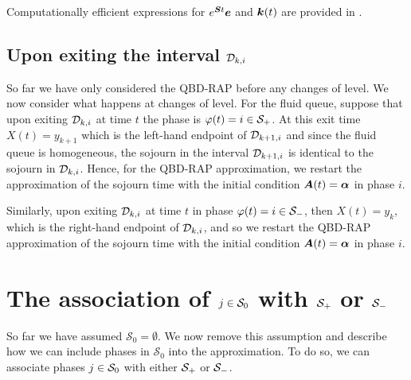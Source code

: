 Computationally efficient expressions for \(e^{\boldsymbol{S}t}\boldsymbol e\) and \(\boldsymbol k(t)\) are provided in \citep{hht2020}. 

\subsection{Upon exiting the interval \(\mathcal{D}_{k,i}\)} So far we have only considered the QBD-RAP before any changes of level. We now consider what happens at changes of level. For the fluid queue, suppose that upon exiting \(\mathcal{D}_{k,i}\) at time \(t\) the phase is \(\varphi(t)=i\in\mathcal{S}_+\). At this exit time \(X(t)=y_{k+1}\) which is the left-hand endpoint of \(\mathcal{D}_{k+1,i}\) and since the fluid queue is homogeneous, the sojourn in the interval \(\mathcal{D}_{k+1,i}\) is identical to the sojourn in \(\mathcal{D}_{k,i}\). Hence, for the QBD-RAP approximation, we restart the approximation of the sojourn time with the initial condition \(\boldsymbol A(t)=\boldsymbol \alpha\) in phase \(i\). 

Similarly, upon exiting \(\mathcal{D}_{k,i}\) at time \(t\) in phase \(\varphi(t)=i\in\mathcal{S}_-\), then \(X(t)=y_k\), which is the right-hand endpoint of \(\mathcal{D}_{k,i}\), and so we restart the QBD-RAP approximation of the sojourn time with the initial condition \(\boldsymbol A(t)=\boldsymbol \alpha\) in phase \(i\).

\section{The association of \(j\in\mathcal{S}_0\) with \(\mathcal{S}_+\) or \(\mathcal{S}_-\)}\label{sec: zero states}
So far we have assumed \(\mathcal S_0=\emptyset\). We now remove this assumption and describe how we can include phases in \(\mathcal S_0\) into the approximation. To do so, we can associate phases \(j\in\mathcal{S}_0\) with either \(\mathcal{S}_+\) or \(\mathcal{S}_-\). 

